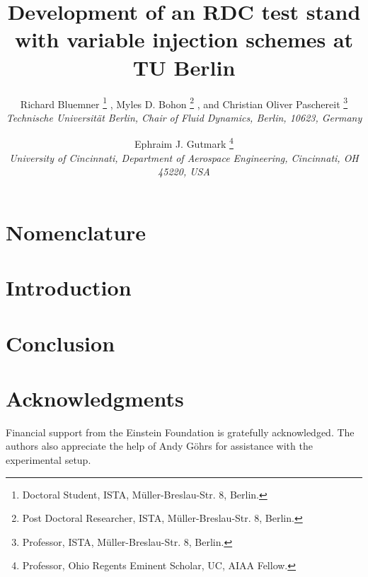 \documentclass{aiaa-tc}%
\title{Development of an RDC test stand with variable injection schemes at TU Berlin}
\author{
    Richard Bluemner%
  	\thanks{Doctoral Student, ISTA, Müller-Breslau-Str. 8, Berlin.}
  ,	Myles D. Bohon%
  	\thanks{Post Doctoral Researcher, ISTA, Müller-Breslau-Str. 8, Berlin.}
  , and Christian Oliver Paschereit%
  \thanks{Professor, ISTA, Müller-Breslau-Str. 8, Berlin.}\\
  {\normalsize\itshape
   Technische Universität Berlin, Chair of Fluid Dynamics, Berlin, 10623, Germany}
  \and
  Ephraim J. Gutmark%
   \thanks{Professor, Ohio Regents Eminent Scholar, UC, AIAA Fellow.}\\
  {\normalsize\itshape
  University of Cincinnati, Department of Aerospace Engineering, Cincinnati, OH 45220, USA}
 }
\begin{document}
\maketitle

\begin{abstract}

\end{abstract}

\section*{Nomenclature}


\section{Introduction}


\section{Conclusion}


\section*{Acknowledgments}
Financial support from the Einstein Foundation is gratefully acknowledged. The authors also appreciate the help of Andy Göhrs for assistance with the experimental setup.



\end{document}
